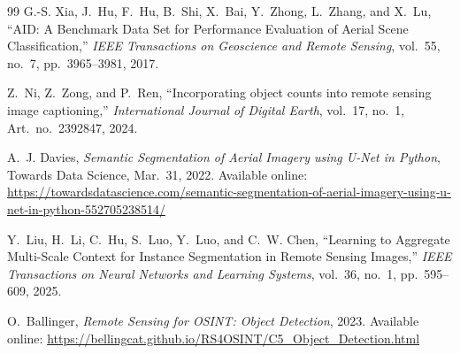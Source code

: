 \documentclass[11pt,a4paper]{article}
\begin{document}
\begin{thebibliography}{99}
G.-S. Xia, J.~Hu, F.~Hu, B.~Shi, X.~Bai, Y.~Zhong, L.~Zhang,
and X.~Lu,
``AID: A Benchmark Data Set for Performance Evaluation of Aerial
Scene Classification,''
\textit{IEEE Transactions on Geoscience and Remote Sensing},
vol.~55, no.~7, pp.~3965--3981, 2017.

Z.~Ni, Z.~Zong, and P.~Ren,
``Incorporating object counts into remote sensing image captioning,''
\textit{International Journal of Digital Earth},
vol.~17, no.~1, Art.~no.~2392847, 2024.

A.~J. Davies,
\textit{Semantic Segmentation of Aerial Imagery using U-Net in Python},
Towards Data Science, Mar.~31, 2022.
Available online:
\url{https://towardsdatascience.com/semantic-segmentation-of-aerial-imagery-using-u-net-in-python-552705238514/}

Y.~Liu, H.~Li, C.~Hu, S.~Luo, Y.~Luo, and C.~W. Chen,
``Learning to Aggregate Multi-Scale Context for Instance Segmentation
in Remote Sensing Images,''
\textit{IEEE Transactions on Neural Networks and Learning Systems},
vol.~36, no.~1, pp.~595--609, 2025.

O.~Ballinger,
\textit{Remote Sensing for OSINT: Object Detection},
2023.
Available online:
\url{https://bellingcat.github.io/RS4OSINT/C5_Object_Detection.html}

\end{thebibliography}
\end{document}
